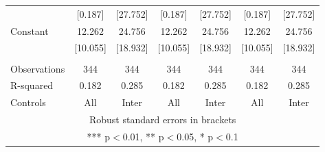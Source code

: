 \begin{tabular}{lcccccc}
 & [0.187] & [27.752] & [0.187] & [27.752] & [0.187] & [27.752] \\
Constant & 12.262 & 24.756 & 12.262 & 24.756 & 12.262 & 24.756 \\
 & [10.055] & [18.932] & [10.055] & [18.932] & [10.055] & [18.932] \\
 &  &  &  &  &  &  \\
Observations & 344 & 344 & 344 & 344 & 344 & 344 \\
R-squared & 0.182 & 0.285 & 0.182 & 0.285 & 0.182 & 0.285 \\
 Controls & All & Inter & All & Inter & All & Inter \\ \hline
\multicolumn{7}{c}{ Robust standard errors in brackets} \\
\multicolumn{7}{c}{ *** p$<$0.01, ** p$<$0.05, * p$<$0.1} \\
\end{tabular}
